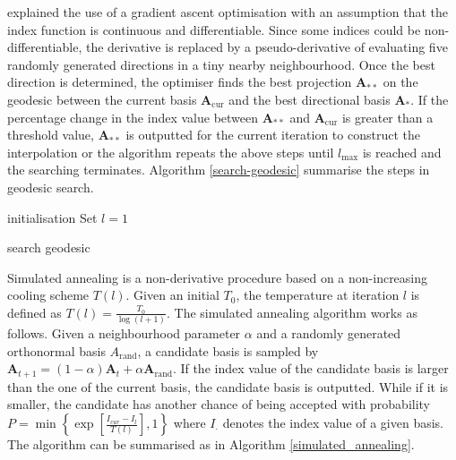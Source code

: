 \documentclass[12pt]{article}
\begin{document}
\citet{cook1995grand} explained the use of a gradient ascent
optimisation with an assumption that the index function is continuous
and differentiable. Since some indices could be non-differentiable, the
derivative is replaced by a pseudo-derivative of evaluating five
randomly generated directions in a tiny nearby neighbourhood. Once the
best direction is determined, the optimiser finds the best projection
\(\mathbf{A}_{**}\) on the geodesic between the current basis
\(\mathbf{A}_{\text{cur}}\) and the best directional basis
\(\mathbf{A}_{*}\). If the percentage change in the index value between
\(\mathbf{A}_{**}\) and \(\mathbf{A}_{\text{cur}}\) is greater than a
threshold value, \(\mathbf{A}_{**}\) is outputted for the current
iteration to construct the interpolation or the algorithm repeats the
above steps until \(l_{\max}\) is reached and the searching terminates.
Algorithm \ref{search-geodesic} summarise the steps in geodesic search.

\begin{algorithm}
\SetAlgoLined
{}
  initialisation\;
  Set $l = 1$\;
  \caption{search geodesic}
  \label{search-geodesic}
\end{algorithm}

Simulated annealing
\citep[\citet{kirkpatrick1983optimization}]{bertsimas1993simulated} is a
non-derivative procedure based on a non-increasing cooling scheme
\(T(l)\). Given an initial \(T_0\), the temperature at iteration \(l\)
is defined as \(T(l) = \frac{T_0}{\log(l + 1)}\). The simulated
annealing algorithm works as follows. Given a neighbourhood parameter
\(\alpha\) and a randomly generated orthonormal basis
\(A_{\text{rand}}\), a candidate basis is sampled by
\(\mathbf{A}_{t+1} = (1 - \alpha)\mathbf{A}_{t} + \alpha \mathbf{A}_{\text{rand}}\).
If the index value of the candidate basis is larger than the one of the
current basis, the candidate basis is outputted. While if it is smaller,
the candidate has another chance of being accepted with probability
\(P= \min\left\{\exp\left[\frac{I_{cur} - I_{l}}{T(l)}\right],1\right\}\)
where \(I_{\cdot}\) denotes the index value of a given basis. The
algorithm can be summarised as in Algorithm \ref{simulated_annealing}.
\end{document}
